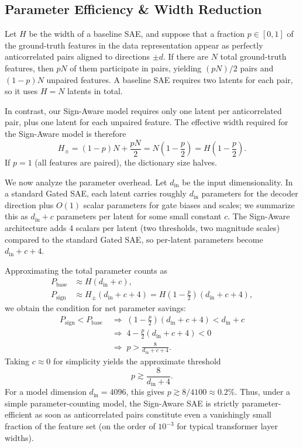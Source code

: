 \documentclass{article}
\begin{document}
\subsection{Parameter Efficiency \& Width Reduction}

Let $H$ be the width of a baseline SAE, and suppose that a fraction $p \in [0, 1]$ of the ground-truth features in the data representation appear as perfectly anticorrelated pairs aligned to directions $\pm d$. If there are $N$ total ground-truth features, then $pN$ of them participate in pairs, yielding $(pN)/2$ pairs and $(1-p)N$ unpaired features. A baseline SAE requires two latents for each pair, so it uses $H = N$ latents in total.

In contrast, our Sign-Aware model requires only one latent per anticorrelated pair, plus one latent for each unpaired feature. The effective width required for the Sign-Aware model is therefore
\begin{equation}
    H_{\pm} = (1-p)N + \frac{pN}{2} = N \left( 1 - \frac{p}{2} \right) = H \left( 1 - \frac{p}{2} \right).
\end{equation}
If $p=1$ (all features are paired), the dictionary size halves.

We now analyze the parameter overhead. Let $d_{\text{in}}$ be the input dimensionality. In a standard Gated SAE, each latent carries roughly $d_{\text{in}}$ parameters for the decoder direction plus $O(1)$ scalar parameters for gate biases and scales; we summarize this as $d_{\text{in}} + c$ parameters per latent for some small constant $c$. The Sign-Aware architecture adds 4 scalars per latent (two thresholds, two magnitude scales) compared to the standard Gated SAE, so per-latent parameters become $d_{\text{in}} + c + 4$.

Approximating the total parameter counts as
\begin{align}
    P_{\text{base}} &\approx H (d_{\text{in}} + c), \\
    P_{\text{sign}} &\approx H_{\pm} (d_{\text{in}} + c + 4) = H \left(1 - \frac{p}{2}\right) (d_{\text{in}} + c + 4),
\end{align}
we obtain the condition for net parameter savings:
\begin{align}
    P_{\text{sign}} < P_{\text{base}}
    &\;\Longrightarrow\; \left(1 - \frac{p}{2}\right) (d_{\text{in}} + c + 4) < d_{\text{in}} + c \\
    &\;\Longrightarrow\; 4 - \frac{p}{2}(d_{\text{in}} + c + 4) < 0 \\
    &\;\Longrightarrow\; p > \frac{8}{d_{\text{in}} + c + 4}.
\end{align}
Taking $c \approx 0$ for simplicity yields the approximate threshold
\begin{equation}
    p \gtrsim \frac{8}{d_{\text{in}} + 4}.
\end{equation}
For a model dimension $d_{\text{in}} = 4096$, this gives $p \gtrsim 8/4100 \approx 0.2\%$. Thus, under a simple parameter-counting model, the Sign-Aware SAE is strictly parameter-efficient as soon as anticorrelated pairs constitute even a vanishingly small fraction of the feature set (on the order of $10^{-3}$ for typical transformer layer widths).
\end{document}
